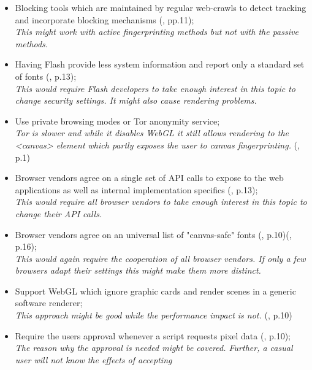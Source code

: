 \begin{itemize}
	\item Blocking tools which are maintained by regular web-crawls to detect tracking and incorporate blocking mechanisms (\textcite{acar14}, pp.11);\\
	\textit{This might work with active fingerprinting methods but not with the passive methods.}

	\item Having Flash provide less system information and report only a standard set of fonts (\textcite{nikiforakis13}, p.13);\\
	\textit{This would require Flash developers to take enough interest in this topic to change security settings. It might also cause rendering problems.} 
	
	\item Use private browsing modes or Tor anonymity service;\\
	\textit{Tor is slower and while it disables WebGL it still allows rendering to the <canvas> element which partly exposes the user to canvas fingerprinting.} (\textcite{mowery12}, p.1)
	
	\item Browser vendors agree on a single set of API calls to expose to the web applications as well as internal implementation specifics (\textcite{nikiforakis13}, p.13);\\
	\textit{This would require all browser vendors to take enough interest in this topic to change their API calls.}
	
	\item Browser vendors agree on an universal list of "canvas-safe" fonts (\textcite{mowery12}, p.10)(\textcite{boda11}, p.16);\\
	\textit{This would again require the cooperation of all browser vendors. If only a few browsers adapt their settings this might make them more distinct.} 
	
	\item Support WebGL which ignore graphic cards and render scenes in a generic software renderer;\\
	\textit{This approach might be good while the performance impact is not.} (\textcite{mowery12}, p.10)
	
	\item Require the users approval whenever a script requests pixel data (\textcite{mowery12}, p.10);\\
	\textit{The reason why the approval is needed might be covered. Further, a casual user will not know the effects of accepting}
	

\end{itemize}
